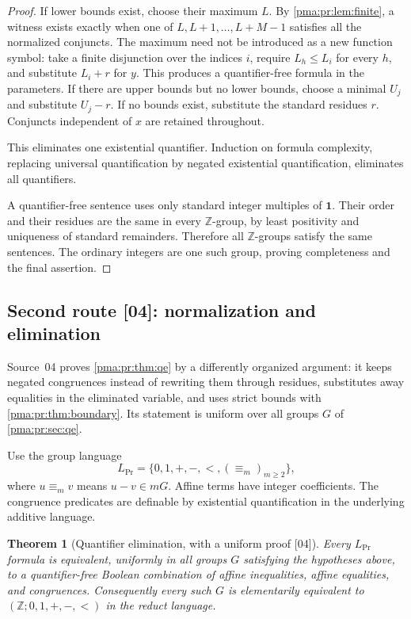 \documentclass[11pt]{article}
\numberwithin{equation}{section}
\newtheorem{theorem}{Theorem}[section]
\theoremstyle{definition}
\theoremstyle{remark}
\newcommand{\Z}{\mathbb Z}
\newcommand{\one}{\mathbf 1}
\newcommand{\src}[1]{\textup{\textsf{\small[#1]}}}
\begin{document}
\begin{proof}
If lower bounds exist, choose their maximum $L$. By
\cref{pma:pr:lem:finite}, a witness exists exactly when one of
$L,L+1,\ldots,L+M-1$ satisfies all the normalized conjuncts. The maximum
need not be introduced as a new function symbol: take a finite disjunction
over the indices $i$, require $L_h\leq L_i$ for every $h$, and substitute
$L_i+r$ for $y$. This produces a quantifier-free formula in the parameters.
If there are upper bounds but no lower bounds, choose a minimal $U_j$
and substitute $U_j-r$. If no bounds exist, substitute the standard
residues $r$. Conjuncts independent of $x$ are retained throughout.

This eliminates one existential quantifier. Induction on formula
complexity, replacing universal quantification by negated existential
quantification, eliminates all quantifiers.

A quantifier-free sentence uses only standard integer multiples of
$\one$. Their order and their residues are the same in every $\Z$-group,
by least positivity and uniqueness of standard remainders. Therefore all
$\Z$-groups satisfy the same sentences. The ordinary integers are one
such group, proving completeness and the final assertion.
\end{proof}

\subsection{Second route \src{04}: normalization and elimination}\label{pma:pr:sec:qe04}

Source~04 proves \cref{pma:pr:thm:qe} by a differently organized argument: it
keeps negated congruences instead of rewriting them through residues,
substitutes away equalities in the eliminated variable, and uses strict bounds
with \cref{pma:pr:thm:boundary}. Its statement is uniform over all groups $G$
of \cref{pma:pr:sec:qe}.

Use the group language
\[
 L_{\mathrm{Pr}}=\{0,1,+,-,<,(\equiv_m)_{m\geq2}\},
\]
where $u\equiv_m v$ means $u-v\in mG$. Affine terms have integer
coefficients. The congruence predicates are definable by existential
quantification in the underlying additive language.

\begin{theorem}[Quantifier elimination, with a uniform proof \src{04}]\label{pma:pr:s04:thm:qe}
Every $L_{\mathrm{Pr}}$ formula is equivalent, uniformly in all groups $G$
satisfying the hypotheses above, to a quantifier-free Boolean combination
of affine inequalities, affine equalities, and congruences.
Consequently every such $G$ is elementarily equivalent to
$(\Z;0,1,+,-,<)$ in the reduct language.
\end{theorem}
\end{document}
